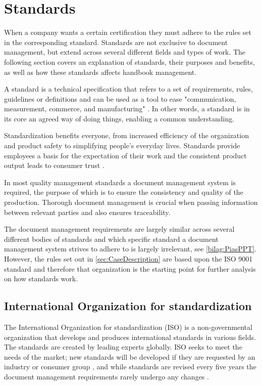 \section{Standards} \label{sec:standards}
When a company wants a certain certification they must adhere to the rules set in the corresponding standard.
Standards are not exclusive to document management, but extend across several different fields and types of work.
The following section covers an explanation of standards, their purposes and benefits, as well as how these standards affects handbook management.

A standard is a technical specification that refers to a set of requirements, rules, guidelines or definitions \citep[p.~5]{Standard} and can be used as a tool to ease "communication, measurement, commerce, and manufacturing" \cite{Standardtool}.
In other words, a standard is in its core an agreed way of doing things, enabling a common understanding.

Standardization benefits everyone, from increased efficiency of the organization and product safety to simplifying people's everyday lives.
Standards provide employees a basis for the expectation of their work and the consistent product output leads to consumer trust \citep[p.~83]{Standardization}.

In most quality management standards a document management system is required, the purpose of which is to ensure the consistency and quality of the production.
Thorough document management is crucial when passing information between relevant parties and also ensures traceability.

The document management requirements are largely similar across several different bodies of standards and which specific standard a document management system strives to adhere to is largely irrelevant, see \cref{bilag:PiasPPT}.
However, the rules set out in \cref{sec:CaseDescription} are based upon the ISO 9001 standard and therefore that organization is the starting point for further analysis on how standards work.

\subsection{International Organization for standardization} \label{sec:ISOstandards}
The International Organization for standardization (ISO) is a non-governmental organization that develops and produces international standards in various fields.
The standards are created by leading experts globally. \cite{ISOinfo}
ISO seeks to meet the needs of the market; new standards will be developed if they are requested by an industry or consumer group \cite{ISOdeveloping}, and while standards are revised every five years the document management requirements rarely undergo any changes \cite{ISOreviewedevery5years}.

